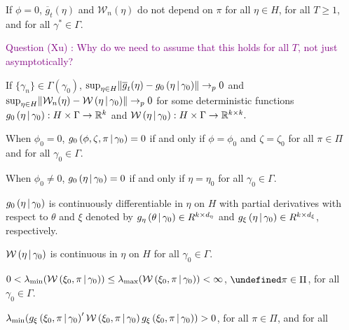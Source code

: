 \documentclass[11pt]{article}
\newcommand{\purple}[1]{\textcolor{purple}{#1}}
\newcommand*{\R}{\mathbb{R}}
\newcommand*{\W}{\mathcal{W}}
\newcommand*{\pto}{\ensuremath{\to_p}}
\newcommand*{\Eta}{H}
\newcommand*{\sampmom}{\ensuremath{\overline{g}_t}}
\DeclarePairedDelimiter\norm{\lVert}{\rVert}
\let\oldforall\forall
\let\forall\undefined
\DeclareMathOperator{\forall}{\oldforall}
\newcommand{\mvert}[1][\middle]{\ensuremath{\,#1\vert\,}}
\begin{document}
\begin{assump}[GMM 1]\label{ass:GMM1}
\begin{assumplist}
    \item If $\phi=0$, $\sampmom(\eta)$ and $\W_{n}(\eta)$ do not depend on $\pi$ for all $\eta \in \Eta$, for
        all $T \geq 1$, and for all $\gamma^{*}\in \Gamma.$ 
        \label{ass:GMM1a}
    \item[] \purple{Question (Xu) : Why do we need to assume that this holds for all $T$, not just
        asymptotically?}
    \item If $\lbrace \gamma_{n} \rbrace \in \Gamma\left(\gamma_0\right)$, $\sup_{\eta \in \Eta}
        \norm*{\sampmom(\eta) - g_0\left(\eta \mvert \gamma_0\right)} \pto 0$ and $\sup_{\eta
        \in \Eta} \norm{\W_{n}(\eta)-\W\left(\eta \mvert \gamma_0\right)} \pto 0$ for some deterministic
        functions $g_0\left(\eta \mvert \gamma_0\right) : \Eta \times \Gamma \to \R^{k}$ and
        $\W\left(\eta \mvert \gamma_0\right) : \Eta \times \Gamma \to \R^{k\times k}.$
        \label{ass:GMM1b}
    \item When $\phi_0=0$,  $g_0\left(\phi, \zeta ,\pi \mvert \gamma_0\right) = 0$ if and only if $\phi =\phi_0$
        and $\zeta = \zeta_0$ for all $\pi \in \Pi$ and for all $\gamma_0 \in \Gamma.$
        \label{ass:GMM1c}
    \item When $\phi_0 \neq 0$, $g_0\left(\eta \mvert \gamma_0\right)=0$ if and only if $\eta =\eta_0$ for all 
        $\gamma_0 \in \Gamma.$
        \label{ass:GMM1d}
    \item  $g_0\left(\eta \mvert \gamma_0\right)$ is continuously differentiable in $\eta $ on $\Eta$ with partial
        derivatives with respect to $\theta$ and $\xi$ denoted by $g_{\eta }\left(\theta \mvert
        \gamma_0\right) \in R^{k\times d_{\eta }}$ and $g_{\xi }\left(\eta \mvert \gamma_0\right)\in R^{k\times
        d_{\xi }}$, respectively.
        \label{ass:GMM1e}
    \item $\W\left(\eta \mvert \gamma_0\right)$ is continuous in $\eta$ on $\Eta$ for all $\gamma_0\in \Gamma$.
        \label{ass:GMM1f}
    \item $0 < \lambda_{\min}(\W\left(\xi_0, \pi \mvert \gamma_0\right))\leq \lambda_{\max }(\W\left(\xi_0,\pi
        \mvert \gamma_0\right)) < \infty$, $\forall \pi \in \Pi$, for all $\gamma_0 \in \Gamma$.
        \label{ass:GMM1g}
    \item $\lambda_{\min} (g_{\xi}\left(\xi_0,\pi \mvert \gamma_0\right)^{\prime} \W\left(\xi_0,\pi \mvert
        \gamma_0\right)g_{\xi }\left(\xi_0,\pi \mvert \gamma_0\right))>0$, for all $\pi \in \Pi$,  and for all 

\end{assumplist}
\end{assump}
\end{document}
